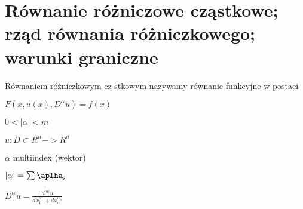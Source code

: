 \section{Równanie różniczowe cząstkowe; rząd równania różniczkowego; warunki graniczne}
Równaniem różniczkowym cz
stkowym nazywamy równanie funkcyjne w postaci

$F(x ,u(x) , D^\alpha u) = f(x)$

$0<|\alpha| < m$

$u:D \subset R^n -> R^n$

$\alpha$ multiindex (wektor)

$|\alpha| = \sum \aplha_i$

$D^\alpha u = \frac{d^{|\alpha|} u}{dx_1^{\alpha_1} + dx_n^{\alpha_n}}$